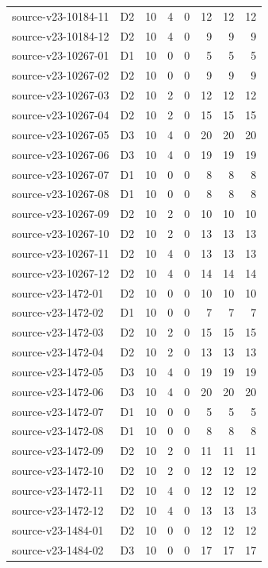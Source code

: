 \begin{longtable}{p{}lrrrrrr}
source-v23-10184-11 & D2 & 10 & 4 & 0 & 12 & 12 & 12\\
source-v23-10184-12 & D2 & 10 & 4 & 0 & 9 & 9 & 9\\
source-v23-10267-01 & D1 & 10 & 0 & 0 & 5 & 5 & 5\\
source-v23-10267-02 & D2 & 10 & 0 & 0 & 9 & 9 & 9\\
source-v23-10267-03 & D2 & 10 & 2 & 0 & 12 & 12 & 12\\
source-v23-10267-04 & D2 & 10 & 2 & 0 & 15 & 15 & 15\\
source-v23-10267-05 & D3 & 10 & 4 & 0 & 20 & 20 & 20\\
source-v23-10267-06 & D3 & 10 & 4 & 0 & 19 & 19 & 19\\
source-v23-10267-07 & D1 & 10 & 0 & 0 & 8 & 8 & 8\\
source-v23-10267-08 & D1 & 10 & 0 & 0 & 8 & 8 & 8\\
source-v23-10267-09 & D2 & 10 & 2 & 0 & 10 & 10 & 10\\
source-v23-10267-10 & D2 & 10 & 2 & 0 & 13 & 13 & 13\\
source-v23-10267-11 & D2 & 10 & 4 & 0 & 13 & 13 & 13\\
source-v23-10267-12 & D2 & 10 & 4 & 0 & 14 & 14 & 14\\
source-v23-1472-01 & D2 & 10 & 0 & 0 & 10 & 10 & 10\\
source-v23-1472-02 & D1 & 10 & 0 & 0 & 7 & 7 & 7\\
source-v23-1472-03 & D2 & 10 & 2 & 0 & 15 & 15 & 15\\
source-v23-1472-04 & D2 & 10 & 2 & 0 & 13 & 13 & 13\\
source-v23-1472-05 & D3 & 10 & 4 & 0 & 19 & 19 & 19\\
source-v23-1472-06 & D3 & 10 & 4 & 0 & 20 & 20 & 20\\
source-v23-1472-07 & D1 & 10 & 0 & 0 & 5 & 5 & 5\\
source-v23-1472-08 & D1 & 10 & 0 & 0 & 8 & 8 & 8\\
source-v23-1472-09 & D2 & 10 & 2 & 0 & 11 & 11 & 11\\
source-v23-1472-10 & D2 & 10 & 2 & 0 & 12 & 12 & 12\\
source-v23-1472-11 & D2 & 10 & 4 & 0 & 12 & 12 & 12\\
source-v23-1472-12 & D2 & 10 & 4 & 0 & 13 & 13 & 13\\
source-v23-1484-01 & D2 & 10 & 0 & 0 & 12 & 12 & 12\\
source-v23-1484-02 & D3 & 10 & 0 & 0 & 17 & 17 & 17\\

\end{longtable}
